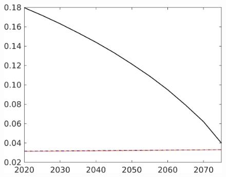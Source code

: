 \begin{figure}[h!!]
\begin{minipage}[]{0.32\textwidth}
	\end{minipage}
	\begin{minipage}[]{0.32\textwidth}
		\includegraphics[width=1\textwidth]{../../codding_model/own_basedOnFried/optimalPol_elastS_DisuSci/figures/all_1705/sg_CompEffOPT_NOT_NoTaus_spillover0_sep1_BN0_ineq0_red0_etaa0.79_lgd0.png}

\end{minipage}
\end{figure}
